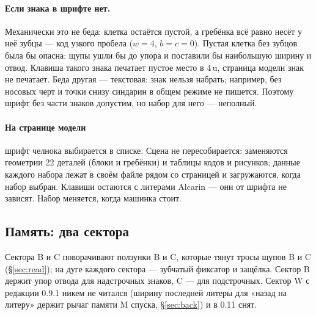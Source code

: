 \paragraph{Если знака в шрифте нет.} Механически это не беда: клетка остаётся пустой, а гребёнка всё равно несёт у неё зубцы — код узкого пробела ($w = 4$, $b = c = 0$). Пустая клетка без зубцов была бы опасна: щупы ушли бы до упора и поставили бы наибольшую ширину и отвод. Клавиша такого знака печатает пустое место в 4\,u, страница модели знак не печатает. Беда другая — текстовая: знак нельзя набрать; например, без носовых черт и точки снизу синдарин в общем режиме не пишется. Поэтому шрифт без части знаков допустим, но набор для него — неполный.

\paragraph{На странице модели} шрифт челнока выбирается в списке. Сцена не пересобирается: заменяются геометрии 22 деталей (блоки и гребёнки) и таблицы кодов и рисунков; данные каждого набора лежат в своём файле рядом со страницей и загружаются, когда набор выбран. Клавиши остаются с литерами Alcarin — они от шрифта не зависят. Набор меняется, когда машинка стоит.

\subsection{Память: два сектора}

Сектора B и C поворачивают ползунки B и C, которые тянут тросы щупов B и C (\S\ref{sec:read}); на дуге каждого сектора — зубчатый фиксатор и защёлка. Сектор B держит упор отвода для надстрочных знаков, C — для подстрочных. Сектор W с редакции 0.9.1 никем не читался (ширину последней литеры для «назад на литеру» держит рычаг памяти M спуска, \S\ref{sec:back}) и в 0.11 снят.

